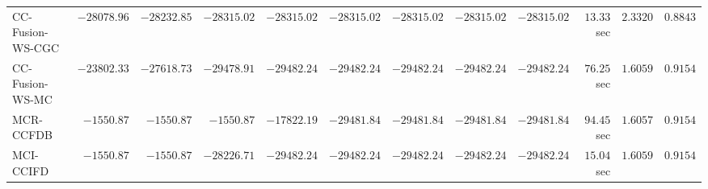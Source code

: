 \begin{table}[H]
\begin{tabular}{lrrrrrrrrrrr}
    CC-Fusion-WS-CGC & $    -28078.96$ & $    -28232.85$ & $    -28315.02$ & $    -28315.02$ & $    -28315.02$ & $    -28315.02$ & $    -28315.02$ & $    -28315.02$ & $        13.33$ sec    & $       2.3320$  & $       0.8843$ \\ 
     CC-Fusion-WS-MC & $    -23802.33$ & $    -27618.73$ & $    -29478.91$ & $    -29482.24$ & $    -29482.24$ & $    -29482.24$ & $    -29482.24$ & $    -29482.24$ & $        76.25$ sec    & $       1.6059$  & $       0.9154$ \\ 
\cmidrule{1-1} 
           MCR-CCFDB & $     -1550.87$ & $     -1550.87$ & $     -1550.87$ & $    -17822.19$ & $    -29481.84$ & $    -29481.84$ & $    -29481.84$ & $    -29481.84$ & $        94.45$ sec    & $       1.6057$  & $       0.9154$ \\ 
\cmidrule{1-1} 
           MCI-CCIFD & $     -1550.87$ & $     -1550.87$ & $    -28226.71$ & $    -29482.24$ & $    -29482.24$ & $    -29482.24$ & $    -29482.24$ & $    -29482.24$ & $        15.04$ sec    & $       1.6059$  & $       0.9154$ \\ 
\bottomrule
\end{tabular}
\end{table}

